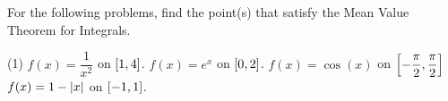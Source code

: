 \documentclass[answers]{exam}
\begin{document}
\noindent
{}
\begin{ex*}
  For the following problems, find the point(s) that satisfy the Mean Value Theorem for Integrals.
\end{ex*}
\begin{tasks}[after-item-skip=\stretch{1}](1)
  \task $f(x)=\dfrac{1}{x^2}$ on ${\left[1,4\right]}$.
  \task $f(x)=e^x$ on ${\left[0,2\right]}$.
  \task $f(x)=\cos(x)$ on ${\left[-\dfrac{\pi}{2},\dfrac{\pi}{2}\right]}$
  \task $f(x)=1-{\left\vert x\right\vert}$ on ${\left[-1,1\right]}$.
\end{tasks}

\pagebreak
\end{document}
